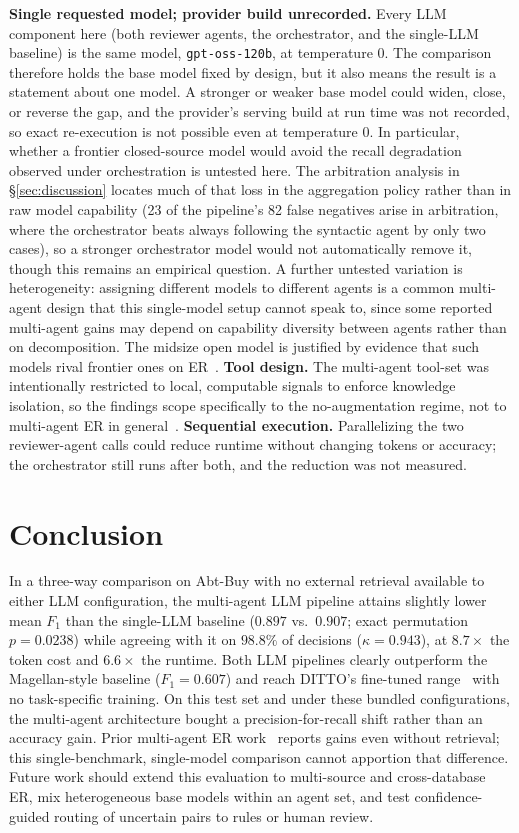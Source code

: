 \documentclass[sigconf]{acmart}
\begin{document}
\textbf{Single requested model; provider build unrecorded.} Every LLM component here (both reviewer agents, the orchestrator, and the single-LLM baseline) is the same model, \texttt{gpt-oss-120b}, at temperature 0.
The comparison therefore holds the base model fixed by design, but it also means the result is a statement about one model.
A stronger or weaker base model could widen, close, or reverse the gap, and the provider's serving build at run time was not recorded, so exact re-execution is not possible even at temperature 0.
In particular, whether a frontier closed-source model would avoid the recall degradation observed under orchestration is untested here.
The arbitration analysis in \S\ref{sec:discussion} locates much of that loss in the aggregation policy rather than in raw model capability (23 of the pipeline's 82 false negatives arise in arbitration, where the orchestrator beats always following the syntactic agent by only two cases), so a stronger orchestrator model would not automatically remove it, though this remains an empirical question.
A further untested variation is heterogeneity: assigning different models to different agents is a common multi-agent design that this single-model setup cannot speak to, since some reported multi-agent gains may depend on capability diversity between agents rather than on decomposition.
The midsize open model is justified by evidence that such models rival frontier ones on ER~\cite{zhang2025deep}.
\textbf{Tool design.} The multi-agent tool-set was intentionally restricted to local, computable signals to enforce knowledge isolation, so the findings scope specifically to the no-augmentation regime, not to multi-agent ER in general~\cite{wang2025cooperative}.
\textbf{Sequential execution.} Parallelizing the two reviewer-agent calls could reduce runtime without changing tokens or accuracy; the orchestrator still runs after both, and the reduction was not measured.

\section{Conclusion}
\label{sec:conclusion}

In a three-way comparison on Abt-Buy with no external retrieval available to either LLM configuration, the multi-agent LLM pipeline attains slightly lower mean $F_1$ than the single-LLM baseline ($0.897$ vs.\ $0.907$; exact permutation $p = 0.0238$) while agreeing with it on $98.8\%$ of decisions ($\kappa = 0.943$), at $8.7\times$ the token cost and $6.6\times$ the runtime.
Both LLM pipelines clearly outperform the Magellan-style baseline ($F_1 = 0.607$) and reach DITTO's fine-tuned range~\cite{li2020deep} with no task-specific training.
On this test set and under these bundled configurations, the multi-agent architecture bought a precision-for-recall shift rather than an accuracy gain.
Prior multi-agent ER work~\cite{althaf2025multi} reports gains even without retrieval; this single-benchmark, single-model comparison cannot apportion that difference.
Future work should extend this evaluation to multi-source and cross-database ER, mix heterogeneous base models within an agent set, and test confidence-guided routing of uncertain pairs to rules or human review.
\end{document}
